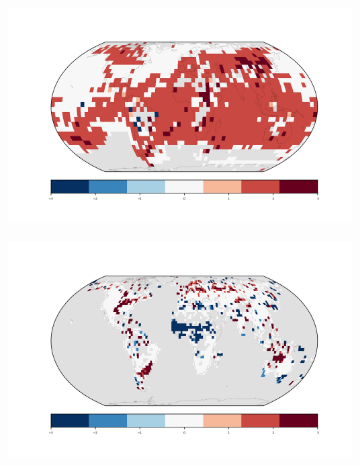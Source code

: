 \documentclass{article}
\begin{document}
	
	
	\begin{figure}
		
	\begin{subfigure}{.5\textwidth}
		\includegraphics[width=\linewidth]{../plots/maps/gridcells_da_temp_2_5_global.png}
	\end{subfigure}
	\begin{subfigure}{.5\textwidth}
		\includegraphics[width=\linewidth]{../plots/maps/gridcells_da_precip_2_5_global.png}
	\end{subfigure}	
		

\end{figure}
\end{document}
